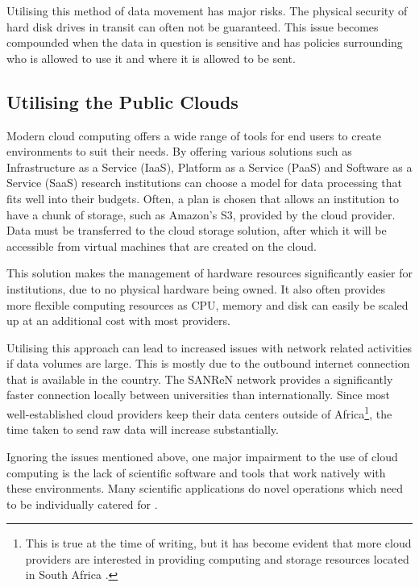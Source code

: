 Utilising this method of data movement has major risks. The physical security of hard disk drives in transit can often not be guaranteed. This issue becomes compounded when the data in question is sensitive and has policies surrounding who is allowed to use it and where it is allowed to be sent.

\subsection{Utilising the Public Clouds}

Modern cloud computing offers a wide range of tools for end users to create environments to suit their needs. By offering various solutions such as Infrastructure as a Service (IaaS), Platform as a Service (PaaS) and Software as a Service (SaaS) research institutions can choose a model for data processing that fits well into their budgets. Often, a plan is chosen that allows an institution to have a chunk of storage, such as Amazon's S3, provided by the cloud provider. Data must be transferred to the cloud storage solution, after which it will be accessible from virtual machines that are created on the cloud.

This solution makes the management of hardware resources significantly easier for institutions, due to no physical hardware being owned. It also often provides more flexible computing resources as CPU, memory and disk can easily be scaled up at an additional cost with most providers.

Utilising this approach can lead to increased issues with network related activities if data volumes are large. This is mostly due to the outbound internet connection that is available in the country. The SANReN network provides a significantly faster connection locally between universities than internationally. Since most well-established cloud providers keep their data centers outside of Africa\footnote{This is true at the time of writing, but it has become evident that more cloud providers are interested in providing computing and storage resources located in South Africa \parencite{aws_sa,azure_sa}.}, the time taken to send raw data will increase substantially.

Ignoring the issues mentioned above, one major impairment to the use of cloud computing is the lack of scientific software and tools that work natively with these environments. Many scientific applications do novel operations which need to be individually catered for \parencite{barga2011bioinformatics}.

